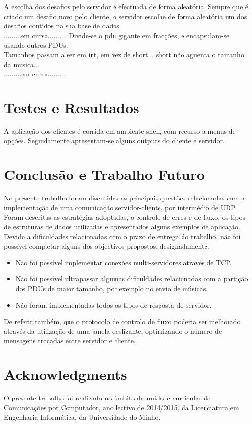 \documentclass{llncs}
\begin{document}
A escolha dos desafios pelo servidor é efectuada de forma aleatória. 
Sempre que é criado um desafio novo pelo cliente, o servidor escolhe de forma aleatória 
um dos desafios contidos na sua base de dados.\\

.........em curso..........
Divide-se o pdu gigante em fracções, e encapsulam-se usando outros PDUs.\\

Tamanhos passam a ser em int, em vez de short... short não aguenta o tamanho da musica...\\
.........em curso..........

\section{Testes e Resultados}
A aplicação dos clientes é corrida em ambiente shell, com recurso a menus de opções. 
Seguidamente apresentam-se alguns outputs do cliente e servidor.



\section{Conclusão e Trabalho Futuro}
No presente trabalho foram discutidas as principais questões relacionadas com a 
implementação de uma comunicação servidor-cliente, por intermédio de UDP. 
Foram descritas as estratégias adoptadas, o controlo de erros e de fluxo, 
os tipos de estruturas de dados utilizadas e apresentados alguns exemplos de aplicação.\\

Devido a dificuldades relacionadas com o prazo de entrega do trabalho, não foi possível 
completar alguns dos objectivos propostos, designadamente:
\begin{itemize}
\item Não foi possível implementar conexões multi-servidores através de TCP.
\item Não foi possível ultrapassar algumas dificuldades relacionadas com a 
	partição dos PDUs de maior tamanho, por exemplo no envio de músicas.
\item Não foram implementadas todos os tipos de resposta do servidor.
\end{itemize}

De referir também, que o protocolo de controlo de fluxo poderia ser melhorado através da 
utilização de uma janela deslizante, optimizando o número de mensagens trocadas entre 
servidor e cliente.

\section*{Acknowledgments}
O presente trabalho foi realizado no âmbito da unidade curricular de Comunicações por Computador, 
ano lectivo de 2014/2015, da Licenciatura em Engenharia Informática, da Universidade do Minho.



\end{document}
